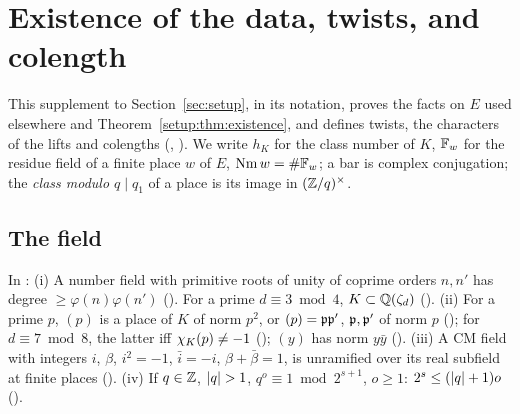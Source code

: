 \section{Existence of the data, twists, and colength}\label{sec:data}

This supplement to Section~\ref{sec:setup}, in its notation, proves the facts on $E$ used
elsewhere and Theorem~\ref{setup:thm:existence}, and defines twists, the characters of the lifts
and colengths (,
). We write $h_K$ for the class number of $K$, $\mathbb{F}_w$ for
the residue field of a finite place $w$ of $E$, $\operatorname{Nm} w = \#\mathbb{F}_w$; a bar is complex conjugation; the
\emph{class modulo $q \mid q_1$} of a place is its image in $(\mathbb{Z}/q)^\times$.

\subsection{The field}

\begin{fact}\label{data:fact:ant}
In : (i) A number field with primitive roots of unity of
coprime orders $n, n'$ has degree $\ge \varphi(n)\varphi(n')$
(). For a prime $d \equiv 3 \bmod 4$,
$K \subset \mathbb{Q}(\zeta_d)$ (). (ii) For a prime $p$, $(p)$ is
a place of $K$ of norm $p^2$, or $(p) = \mathfrak{p}\mathfrak{p}'$, $\mathfrak{p}, \mathfrak{p}'$ of norm $p$
(); for $d \equiv 7 \bmod 8$, the latter iff
$\chi_K(p) \ne -1$ (); $(y)$ has norm $y\bar y$
(). (iii) A CM field with integers $i$, $\beta$,
$i^2 = -1$, $\bar i = -i$, $\beta + \bar\beta = 1$, is unramified over its real subfield at finite
places (). (iv) If $q \in \mathbb{Z}$, $\lvert q\rvert > 1$,
$q^o \equiv 1 \bmod 2^{s+1}$, $o \ge 1$: $2^s \le (\lvert q\rvert + 1)o$
().
\end{fact}

